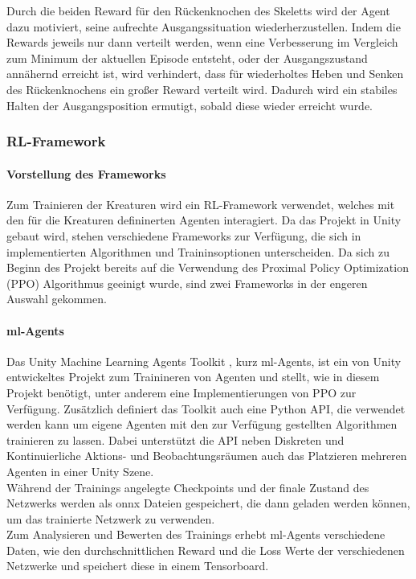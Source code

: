 Durch die beiden Reward für den Rückenknochen des Skeletts wird der Agent dazu motiviert, seine aufrechte Ausgangssituation wiederherzustellen. Indem die Rewards jeweils nur dann verteilt werden, wenn eine Verbesserung im Vergleich zum Minimum der aktuellen Episode entsteht, oder der Ausgangszustand annähernd erreicht ist, wird verhindert, dass für wiederholtes Heben und Senken des Rückenknochens ein großer Reward verteilt wird. Dadurch wird ein stabiles Halten der Ausgangsposition ermutigt, sobald diese wieder erreicht wurde.

\subsubsection{RL-Framework}

\paragraph{Vorstellung des Frameworks} \fup
Zum Trainieren der Kreaturen wird ein RL-Framework verwendet, welches mit den für die Kreaturen defininerten Agenten interagiert. Da das Projekt in Unity gebaut wird, stehen verschiedene Frameworks zur Verfügung, die sich in implementierten Algorithmen und Traininsoptionen unterscheiden. Da sich zu Beginn des Projekt bereits auf die Verwendung des Proximal Policy Optimization (PPO) Algorithmus geeinigt wurde, sind zwei Frameworks in der engeren Auswahl gekommen.

\paragraph{ml-Agents}\fup \label{mlAgentsFramework}
\noindent Das Unity Machine Learning Agents Toolkit \cite{juliani2020}, kurz ml-Agents, ist ein von Unity entwickeltes Projekt zum Trainineren von Agenten und stellt, wie in diesem Projekt benötigt, unter anderem eine Implementierungen von PPO zur Verfügung.
Zusätzlich definiert das Toolkit auch eine Python API, die verwendet werden kann um eigene Agenten mit den zur Verfügung gestellten Algorithmen trainieren zu lassen.
Dabei unterstützt die API neben Diskreten und Kontinuierliche Aktions- und Beobachtungsräumen auch das Platzieren mehreren Agenten in einer Unity Szene.\\

\noindent Während der Trainings angelegte Checkpoints und der finale Zustand des Netzwerks werden als onnx Dateien gespeichert, die dann geladen werden können, um das trainierte Netzwerk zu verwenden.\\
Zum Analysieren und Bewerten des Trainings erhebt ml-Agents verschiedene Daten, wie den durchschnittlichen Reward und die Loss Werte der verschiedenen Netzwerke und speichert diese in einem Tensorboard. 

